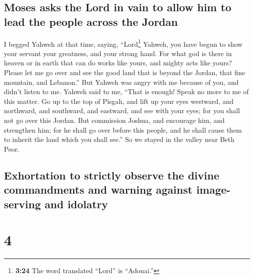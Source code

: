 \hypertarget{moses-asks-the-lord-in-vain-to-allow-him-to-lead-the-people-across-the-jordan}{%
\subsection{Moses asks the Lord in vain to allow him to lead the people
across the
Jordan}\label{moses-asks-the-lord-in-vain-to-allow-him-to-lead-the-people-across-the-jordan}}

 I begged Yahweh at that time, saying, 
``Lord\footnote{\textbf{3:24} The word translated ``Lord'' is
  ``Adonai.''} Yahweh, you have begun to show your servant your
greatness, and your strong hand. For what god is there in heaven or in
earth that can do works like yours, and mighty acts like yours?
 Please let me go over and see the good land that is
beyond the Jordan, that fine mountain, and Lebanon.'' 
But Yahweh was angry with me because of you, and didn't listen to me.
Yahweh said to me, ``That is enough! Speak no more to me of this matter.
 Go up to the top of Pisgah, and lift up your eyes
westward, and northward, and southward, and eastward, and see with your
eyes; for you shall not go over this Jordan.  But
commission Joshua, and encourage him, and strengthen him; for he shall
go over before this people, and he shall cause them to inherit the land
which you shall see.''  So we stayed in the valley near
Beth Peor.

\hypertarget{exhortation-to-strictly-observe-the-divine-commandments-and-warning-against-image-serving-and-idolatry}{%
\subsection{Exhortation to strictly observe the divine commandments and
warning against image-serving and
idolatry}\label{exhortation-to-strictly-observe-the-divine-commandments-and-warning-against-image-serving-and-idolatry}}

\hypertarget{section-3}{%
\section{4}\label{section-3}}

